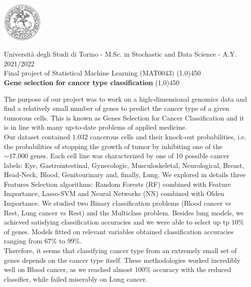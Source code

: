\documentclass[a4paper,11pt, oneside]{article}  %
\begin{document}
	
	\setcounter{secnumdepth}{2}
	\pagestyle{plain} %
	
	\centerline {\includegraphics[width=2cm]{logo.jpg}}
	\begin{center}
		Università degli Studi di Torino - M.Sc.  in Stochastic and Data Science - A.Y.  2021/2022 \\
		\Large { Final project of Statistical Machine Learning (MAT0043)}
		\line(1,0){450}\\ 
		\vspace{0.4cm} 
		{ \huge \textbf{Gene selection for cancer type classification} }
		\vspace{0.1cm}
		\line(1,0){450} \\
	\end{center}
	
	
	The purpose of our project was to work on a high-dimensional genomics data and find a relatively small number of genes to predict the cancer type of a given tumorous cells. This is known as Genes Selection for Cancer Classification and it is in line with many up-to-date problems of applied medicine. \\
	Our dataset contained $1.032$ cancerous cells and their knock-out probabilities, i.e. the probabilities of stopping the growth of tumor by inhibiting one of the $\sim 17.000$ genes. Each cell line was characterized by one of 10 possible cancer labels: Eye, Gastrointestinal, Gynecologic, Musculoskeletal, Neurological, Breast, Head-Neck, Blood, Genitourinary and, finally, Lung. We explored in details three Features Selection algorithms: Random Forests (RF) combined with Feature Importance, Lasso-SVM and Neural Networks (NN) combined with Olden Importance.  We studied two Binary classification problems (Blood cancer vs Rest, Lung cancer vs Rest) and the Multiclass problem. Besides lung models, we achieved satisfying classification accuracies and we were able to select up tp $10\%$ of genes. Models fitted on relevant variables obtained classification accuracies ranging from $67\%$ to $99\%$. \\
	Therefore, it seems that classifying cancer type from an extremely small set of genes depends on the cancer type itself. These methodologies worked incredibly well on Blood cancer, as  we reached almost $100\%$ accuracy with the reduced classifier,  while failed miserably on Lung cancer.  
	
\end{document}
